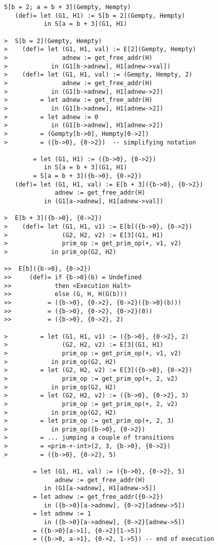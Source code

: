 \begin{verbatim}
S[b = 2; a = b + 3](Gempty, Hempty)
   (def)= let (G1, H1) := S[b = 2](Gempty, Hempty)
           in S[a = b + 3](G1, H1)

>  S[b = 2](Gempty, Hempty)
>    (def)= let (G1, H1, val) := E[2](Gempty, Hempty)
>               adnew := get_free_addr(H)
>            in (G1[b->adnew], H1[adnew->val])
>    (def)= let (G1, H1, val) := (Gempty, Hempty, 2)
>               adnew := get_free_addr(H)
>            in (G1[b->adnew], H1[adnew->2])
>         = let adnew := get_free_addr(H)
>            in (G1[b->adnew], H1[adnew->2])
>         = let adnew := 0
>            in (G1[b->adnew], H1[adnew->2])
>         = (Gempty[b->0], Hempty[0->2])
>         = ({b->0}, {0->2})  -- simplifying notation

        = let (G1, H1) := ({b->0}, {0->2})
           in S[a = b + 3](G1, H1)
        = S[a = b + 3]({b->0}, {0->2})
   (def)= let (G1, H1, val) := E[b + 3]({b->0}, {0->2})
              adnew := get_free_addr(H)
           in (G1[a->adnew], H1[adnew->val])

>  E[b + 3]({b->0}, {0->2})
>    (def)= let (G1, H1, v1) := E[b]({b->0}, {0->2})
>               (G2, H2, v2) := E[3](G1, H1)
>               prim_op := get_prim_op(+, v1, v2)
>            in prim_op(G2, H2)

>>  E[b]({b->0}, {0->2})
>>     (def)= if {b->0}(b) = Undefined
>>            then <Execution Halt>
>>            else (G, H, H(G(b)))
>>          = ({b->0}, {0->2}, {0->2}({b->0}(b)))
>>          = ({b->0}, {0->2}, {0->2}(0))
>>          = ({b->0}, {0->2}, 2)

>         = let (G1, H1, v1) := ({b->0}, {0->2}, 2)
>               (G2, H2, v2) := E[3](G1, H1)
>               prim_op := get_prim_op(+, v1, v2)
>            in prim_op(G2, H2)
>         = let (G2, H2, v2) := E[3]({b->0}, {0->2})
>               prim_op := get_prim_op(+, 2, v2)
>            in prim_op(G2, H2)
>         = let (G2, H2, v2) := ({b->0}, {0->2}, 3)
>               prim_op := get_prim_op(+, 2, v2)
>            in prim_op(G2, H2)
>         = let prim_op := get_prim_op(+, 2, 3)
>            in prim_op({b->0}, {0->2})
>         = ... jumping a couple of transitions
>         = <prim-+-int>(2, 3, {b->0}, {0->2})
>         = ({b->0}, {0->2}, 5)

        = let (G1, H1, val) := ({b->0}, {0->2}, 5)
              adnew := get_free_addr(H)
           in (G1[a->adnew], H1[adnew->5])
        = let adnew := get_free_addr({0->2})
           in ({b->0}[a->adnew], {0->2}[adnew->5])
        = let adnew := 1
           in ({b->0}[a->adnew], {0->2}[adnew->5])
        = ({b->0}[a->1], {0->2}[1->5])
        = ({b->0, a->1}, {0->2, 1->5}) -- end of execution
\end{verbatim}

